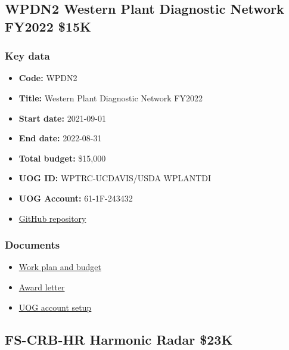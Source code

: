 \newpage
\subsection{WPDN2 Western Plant Diagnostic Network FY2022 \$15K}
\label{WPDN2}

\subsubsection{Key data}
\begin{itemize}
	\setlength\itemsep{0em}	
	\item \textbf{Code:} WPDN2
	\item \textbf{Title:} Western Plant Diagnostic Network FY2022
	\item \textbf{Start date:} 2021-09-01
	\item \textbf{End date:} 2022-08-31
	\item \textbf{Total budget:} \$15,000
	\item \textbf{UOG ID:} WPTRC-UCDAVIS/USDA WPLANTDI
	\item \textbf{UOG Account:} 61-1F-243432
	\item \href{https://github.com/aubreymoore/WPDN}{GitHub repository}
\end{itemize}

\subsubsection{Documents}
\begin{itemize}
	\setlength\itemsep{0em}	
	\item \href{https://github.com/aubreymoore/WPDN/blob/main/WPDN\%202021-2022\%20workplan\%20and\%20budget.pdf}{Work plan and budget}
	\item \href{https://github.com/aubreymoore/WPDN/raw/main/FY2022/WPDN-FY2022-Award-Letter.pdf}{Award letter}
	\item \href{https://github.com/aubreymoore/WPDN/raw/main/FY2022/UOG-account-setup.pdf}{UOG account setup}
\end{itemize}





\newpage
\subsection{FS-CRB-HR Harmonic Radar \$23K}
\label{FS-CRB-HR}

